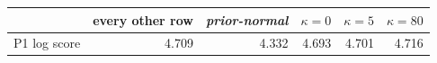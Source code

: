 \begin{tabular}{lrrrrr}
\toprule
 & every other row & \emph{prior-normal} & $\kappa = 0$ & $\kappa = 5$ & $\kappa = 80$ \\
\midrule
P1 log score & 4.709 & 4.332 & 4.693 & 4.701 & 4.716 \\
\bottomrule
\end{tabular}

